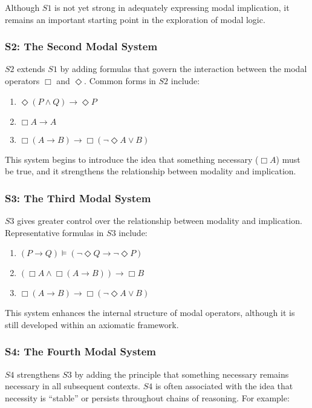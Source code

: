 \documentclass[12pt,a4paper,openany]{article}
\begin{document}
Although $S1$ is not yet strong in adequately expressing modal implication, it remains an important starting point in the exploration of modal logic.

\subsubsection{S2: The Second Modal System}

$S2$ extends $S1$ by adding formulas that govern the interaction between the modal operators $\Box$ and $\Diamond$. Common forms in $S2$ include:

\begin{enumerate}
    \item $\Diamond (P \land Q) \to \Diamond P$
    \item $\Box A \to A$
    \item $\Box (A \to B) \to \Box (\lnot \Diamond A \lor B)$
\end{enumerate}

This system begins to introduce the idea that something necessary ($\Box A$) must be true, and it strengthens the relationship between modality and implication.

\subsubsection{S3: The Third Modal System}

$S3$ gives greater control over the relationship between modality and implication. Representative formulas in $S3$ include:

\begin{enumerate}
    \item $(P \to Q) \vDash (\lnot \Diamond Q \to \lnot \Diamond P)$
    \item $(\Box A \land \Box (A \to B)) \to \Box B$
    \item $\Box (A \to B) \to \Box (\lnot \Diamond A \lor B)$
\end{enumerate}

This system enhances the internal structure of modal operators, although it is still developed within an axiomatic framework.

\subsubsection{S4: The Fourth Modal System}

$S4$ strengthens $S3$ by adding the principle that something necessary remains necessary in all subsequent contexts. $S4$ is often associated with the idea that necessity is ``stable'' or persists throughout chains of reasoning. For example:
\end{document}
